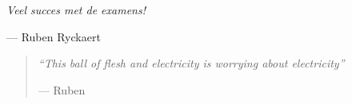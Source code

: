 \documentclass[a4paper,11pt]{article}
\begin{document}
\newpage
\thispagestyle{empty}
\vspace*{\fill}

\begin{center}
	\itshape\Huge
	Veel succes met de examens!
	\par\vspace{1cm}
	\normalfont\Large
	--- Ruben Ryckaert
\end{center}

\vspace{3cm}

\begin{quote}
	\centering
	\itshape\Large
	``This ball of flesh and electricity is worrying about electricity''
	\par\vspace{0.5cm}
	\textup{--- Ruben}
\end{quote}

\vspace*{\fill}
\end{document}
